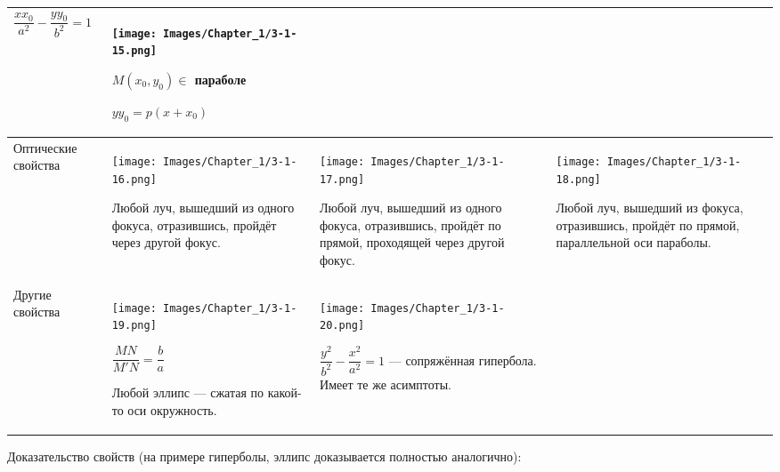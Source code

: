 \begin{center}
\begin{longtable}{|p{2.5cm}|p{4.5cm}|p{4.5cm}|p{4.5cm}|}
        \(\dfrac{x x_0}{a^2} - \dfrac{y y_0}{b^2} = 1\)
         &
        \begin{center}
            \texttt{[image: Images/Chapter\_1/3-1-15.png]}
        \end{center}
        \(M(x_0, y_0) \in\) параболе

        \(y y_0 = p(x + x_0)\)
        \\
        \hline
        Оптические свойства
         &
        \begin{center}
            \texttt{[image: Images/Chapter\_1/3-1-16.png]}
        \end{center}
        Любой луч, вышедший из одного фокуса, отразившись, пройдёт через другой фокус.
         &
        \begin{center}
            \texttt{[image: Images/Chapter\_1/3-1-17.png]}
        \end{center}
        Любой луч, вышедший из одного фокуса, отразившись, пройдёт по прямой, проходящей через другой фокус.
         &
        \begin{center}
            \texttt{[image: Images/Chapter\_1/3-1-18.png]}
        \end{center}
        Любой луч, вышедший из фокуса, отразившись, пройдёт по прямой, параллельной оси параболы.
        \\
        \hline
        Другие свойства
         &
        \begin{center}
            \texttt{[image: Images/Chapter\_1/3-1-19.png]}
        \end{center}
        \(\dfrac{MN}{M'N} = \dfrac{b}{a}\)

        Любой эллипс --- сжатая по какой-то оси окружность.
         &
        \begin{center}
            \texttt{[image: Images/Chapter\_1/3-1-20.png]}
        \end{center}
        \(\dfrac{y^2}{b^2} - \dfrac{x^2}{a^2} = 1\) --- сопряжённая гипербола. Имеет те же асимптоты.
         &

        \\
        \hline
    \end{longtable}
\end{center}
Доказательство свойств (на примере гиперболы, эллипс доказывается полностью аналогично):
